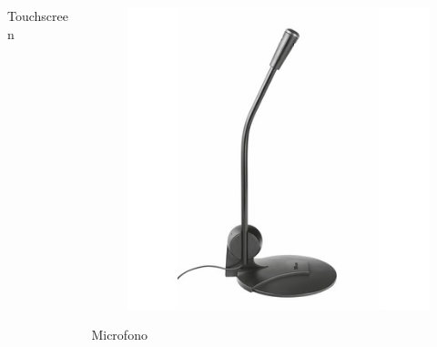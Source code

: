 \documentclass[]{beamer}
\begin{document}
\begin{frame}
\begin{columns}
\begin{column}{.22\textwidth}
\begin{center}
\begin{figure}
    \end{figure}
    Touchscreen
    \end{center}
\end{column}
\begin{column}{.22\textwidth}
  \begin{center} 
    \begin{figure}
      \includegraphics[width=\columnwidth]{img/microfono.jpg}
    \end{figure}
    Microfono
    \end{center}
\end{column}
\end{columns}
\end{frame}
\end{document}
